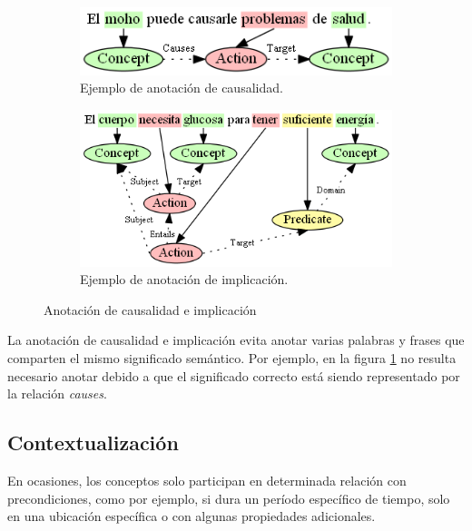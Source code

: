 \vspace{-0.05in}
\begin{figure}[H]
	\centering
	\begin{subfigure}{3.25in}
		\includegraphics[width=\textwidth]{graphics/annotation_example_causes.png}
		\caption{Ejemplo de anotación de causalidad.}
		\vspace{0.4in}
		\label{fig:annotation_example_causes}
	\end{subfigure}
	\begin{subfigure}{3.9in}
		\includegraphics[width=\linewidth]{graphics/annotation_example_entails.png}
		\caption{Ejemplo de anotación de implicación.}
		\label{fig:annotation_example_entails}
	\end{subfigure}
	\caption{Anotación de causalidad e implicación}
\end{figure}

\vspace{-0.1in}
La anotación de causalidad e implicación evita anotar varias palabras y frases que comparten el mismo significado semántico. Por ejemplo, en la figura \ref{fig:annotation_example_causes} no resulta necesario anotar  debido a que el significado correcto está siendo representado por la relación \textit{causes}.

\subsection{Contextualización}
En ocasiones, los conceptos solo participan en determinada relación con precondiciones, como por ejemplo, si dura un período específico de tiempo, solo en una ubicación específica o con algunas propiedades adicionales.

